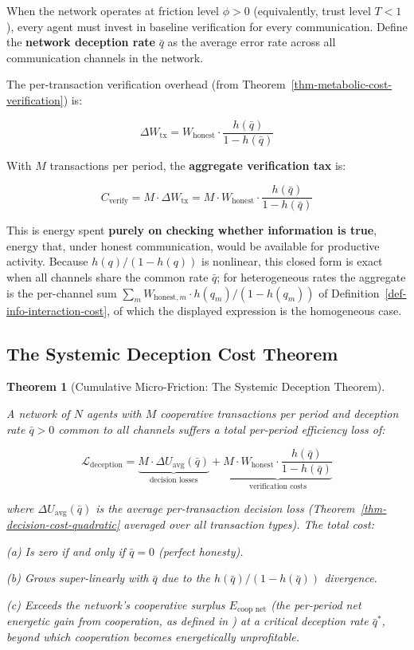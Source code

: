 \documentclass[11pt]{article}
\theoremstyle{plain}
\newtheorem{theorem}{Theorem}
\theoremstyle{definition}
\theoremstyle{remark}
\let\origsubsection\subsection
\renewcommand{\subsection}{\needspace{7\baselineskip}\origsubsection}
\begin{document}
When the network operates at friction level \(\phi > 0\) (equivalently,
trust level \(T < 1\)), every agent must invest in baseline verification
for every communication. Define the \textbf{network deception rate}
\(\bar{q}\) as the average error rate across all communication channels
in the network.

The per-transaction verification overhead (from
Theorem~\ref{thm-metabolic-cost-verification}) is:

\[\Delta W_{\text{tx}} = W_{\text{honest}} \cdot \frac{h(\bar{q})}{1 - h(\bar{q})}\]

With \(M\) transactions per period, the \textbf{aggregate verification
tax} is:

\[C_{\text{verify}} = M \cdot \Delta W_{\text{tx}} = M \cdot W_{\text{honest}} \cdot \frac{h(\bar{q})}{1 - h(\bar{q})}\]

This is energy spent \textbf{purely on checking whether information is
true}, energy that, under honest communication, would be available for
productive activity. Because \(h(q)/(1 - h(q))\) is nonlinear, this
closed form is exact when all channels share the common rate
\(\bar{q}\); for heterogeneous rates the aggregate is the per-channel
sum \(\sum_m W_{\text{honest},m} \cdot h(q_m)/(1 - h(q_m))\) of
Definition~\ref{def-info-interaction-cost}, of which the displayed
expression is the homogeneous case.

\subsection{The Systemic Deception Cost
Theorem}\label{the-systemic-deception-cost-theorem}

\begin{theorem}[Cumulative Micro-Friction: The Systemic Deception Theorem]
\label{thm-systemic-deception}

A network of $N$ agents with $M$ cooperative transactions per period and deception rate $\bar{q} > 0$ common to all channels suffers a total per-period efficiency loss of:

$$\mathcal{L}_{\text{deception}} = \underbrace{M \cdot \Delta U_{\text{avg}}(\bar{q})}_{\text{decision losses}} + \underbrace{M \cdot W_{\text{honest}} \cdot \frac{h(\bar{q})}{1 - h(\bar{q})}}_{\text{verification costs}}$$

where $\Delta U_{\text{avg}}(\bar{q})$ is the average per-transaction decision loss (Theorem~\ref{thm-decision-cost-quadratic} averaged over all transaction types). The total cost:

(a) Is zero if and only if $\bar{q} = 0$ (perfect honesty).

(b) Grows super-linearly with $\bar{q}$ due to the $h(\bar{q})/(1 - h(\bar{q}))$ divergence.

(c) Exceeds the network's cooperative surplus $E_{\text{coop net}}$ (the per-period net energetic gain from cooperation, as defined in \citep{TC-IV}) at a critical deception rate $\bar{q}^*$, beyond which cooperation becomes energetically unprofitable.
\end{theorem}
\end{document}
